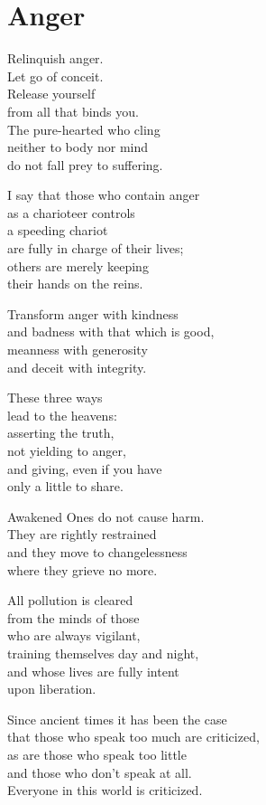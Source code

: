 
\chapter{Anger}


Relinquish anger.\\
Let go of conceit.\\
Release yourself\\
from all that binds you.\\
The pure-hearted who cling\\
neither to body nor mind\\
do not fall prey to suffering.


I say that those who contain anger\\
as a charioteer controls\\
a speeding chariot\\
are fully in charge of their lives;\\
others are merely keeping\\
their hands on the reins.


Transform anger with kindness\\
and badness with that which is good,\\
meanness with generosity\\
and deceit with integrity.


These three ways\\
lead to the heavens:\\
asserting the truth,\\
not yielding to anger,\\
and giving, even if you have\\
only a little to share.


Awakened Ones do not cause harm.\\
They are rightly restrained\\
and they move to changelessness\\
where they grieve no more.


All pollution is cleared\\
from the minds of those\\
who are always vigilant,\\
training themselves day and night,\\
and whose lives are fully intent\\
upon liberation.


Since ancient times it has been the case\\
that those who speak too much are criticized,\\
as are those who speak too little\\
and those who don't speak at all.\\
Everyone in this world is criticized.



